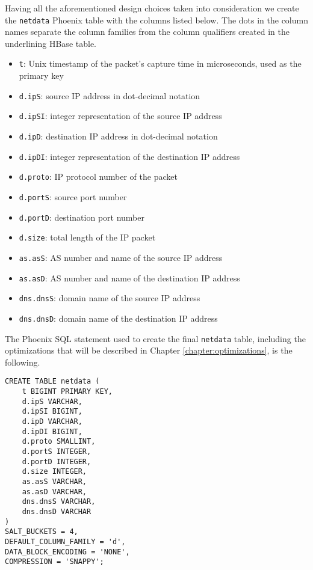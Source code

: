 Having all the aforementioned design choices taken into consideration we create the \texttt{netdata} Phoenix table with the columns listed below. The dots in the column names separate the column families from the column qualifiers created in the underlining HBase table.
\begin{itemize}
\item \texttt{t}: Unix timestamp of the packet's capture time in microseconds, used as the primary key
\item \texttt{d.ipS}: source IP address in dot-decimal notation
\item \texttt{d.ipSI}: integer representation of the source IP address
\item \texttt{d.ipD}: destination IP address in dot-decimal notation
\item \texttt{d.ipDI}: integer representation of the destination IP address
\item \texttt{d.proto}: IP protocol number of the packet
\item \texttt{d.portS}: source port number
\item \texttt{d.portD}: destination port number
\item \texttt{d.size}: total length of the IP packet
\item \texttt{as.asS}: AS number and name of the source IP address
\item \texttt{as.asD}: AS number and name of the destination IP address
\item \texttt{dns.dnsS}: domain name of the source IP address
\item \texttt{dns.dnsD}: domain name of the destination IP address
\end{itemize}

The Phoenix SQL statement used to create the final \texttt{netdata} table, including the optimizations that will be described in Chapter \ref{chapter:optimizations}, is the following.

\begin{lstlisting}[language=PhoenixSQL]
CREATE TABLE netdata (
    t BIGINT PRIMARY KEY,
    d.ipS VARCHAR,
    d.ipSI BIGINT,
    d.ipD VARCHAR,
    d.ipDI BIGINT,
    d.proto SMALLINT,
    d.portS INTEGER,
    d.portD INTEGER,
    d.size INTEGER,
    as.asS VARCHAR,
    as.asD VARCHAR,
    dns.dnsS VARCHAR,
    dns.dnsD VARCHAR
) 
SALT_BUCKETS = 4,
DEFAULT_COLUMN_FAMILY = 'd',
DATA_BLOCK_ENCODING = 'NONE',
COMPRESSION = 'SNAPPY';
\end{lstlisting}


\cleardoublepage
